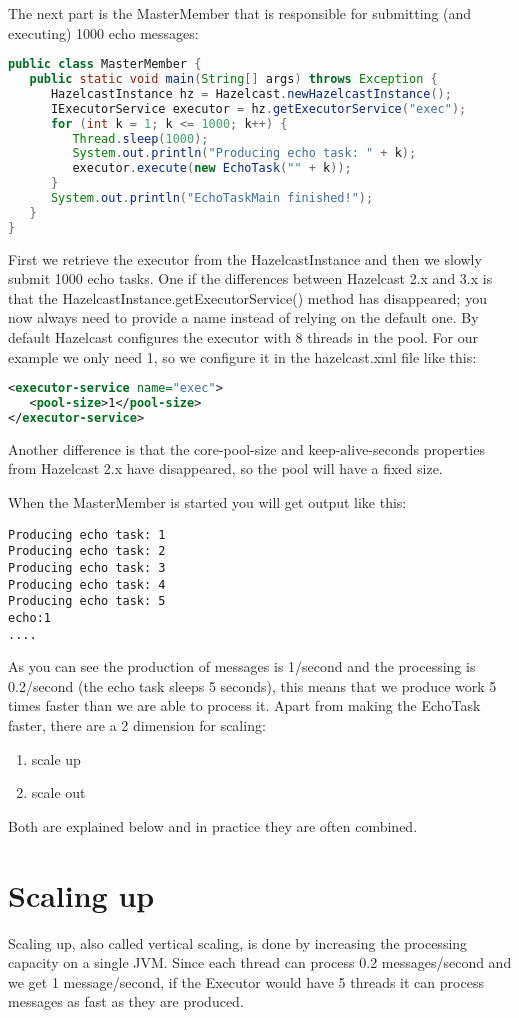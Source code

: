 The next part is the MasterMember that is responsible for submitting (and executing) 1000 echo messages:
\begin{lstlisting}[language=java]
public class MasterMember {
   public static void main(String[] args) throws Exception {
      HazelcastInstance hz = Hazelcast.newHazelcastInstance();
      IExecutorService executor = hz.getExecutorService("exec");
      for (int k = 1; k <= 1000; k++) {
         Thread.sleep(1000);
         System.out.println("Producing echo task: " + k);
         executor.execute(new EchoTask("" + k));
      }
      System.out.println("EchoTaskMain finished!");
   }
}
\end{lstlisting}
First we retrieve the executor from the HazelcastInstance and then we slowly submit 1000 echo tasks. One if the differences between Hazelcast 2.x and 3.x is that the HazelcastInstance.getExecutorService() method has disappeared; you now always need to provide a name instead of relying on the default one. By default Hazelcast configures the executor with 8 threads in the pool. For our example we only need 1, so we configure it in the hazelcast.xml file like this:
\begin{lstlisting}[language=xml]
<executor-service name="exec">
   <pool-size>1</pool-size>
</executor-service>
\end{lstlisting}
Another difference is that the core-pool-size and keep-alive-seconds properties from Hazelcast 2.x have disappeared, so the pool will have a fixed size.

When the MasterMember is started you will get output like this:
\begin{lstlisting}
Producing echo task: 1
Producing echo task: 2
Producing echo task: 3
Producing echo task: 4
Producing echo task: 5
echo:1
....
\end{lstlisting}
As you can see the production of messages is 1/second and the processing is 0.2/second (the echo task sleeps 5 seconds), this means that we produce work 5 times faster than we are able to process it. Apart from making the EchoTask faster, there are a 2 dimension for scaling:
\begin{enumerate}
\item scale up 
\item scale out
\end{enumerate}
Both are explained below and in practice they are often combined. 

\section{Scaling up}
Scaling up, also called vertical scaling, is done by increasing the processing capacity on a single JVM. Since each thread can process 0.2 messages/second and we get 1 message/second, if the Executor would have 5 threads it can process messages as fast as they are produced.

